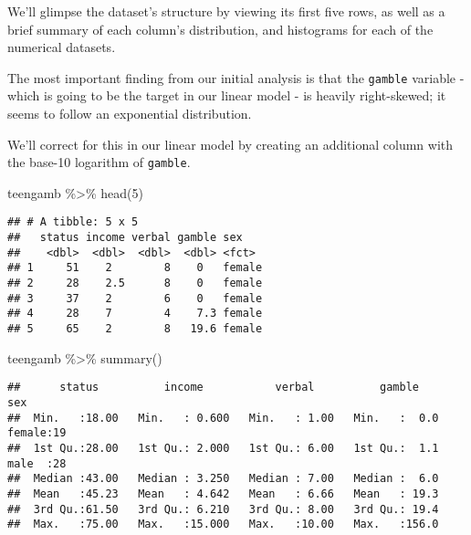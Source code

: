 \documentclass[
]{article}
\newenvironment{Shaded}{\begin{snugshade}}{\end{snugshade}}
\newcommand{\DecValTok}[1]{\textcolor[rgb]{0.00,0.00,0.81}{#1}}
\newcommand{\FunctionTok}[1]{\textcolor[rgb]{0.00,0.00,0.00}{#1}}
\newcommand{\NormalTok}[1]{#1}
\newcommand{\SpecialCharTok}[1]{\textcolor[rgb]{0.00,0.00,0.00}{#1}}
\begin{document}
We'll glimpse the dataset's structure by viewing its first five rows, as
well as a brief summary of each column's distribution, and histograms
for each of the numerical datasets.

The most important finding from our initial analysis is that the
\texttt{gamble} variable - which is going to be the target in our linear
model - is heavily right-skewed; it seems to follow an exponential
distribution.

We'll correct for this in our linear model by creating an additional
column with the base-10 logarithm of \texttt{gamble}.

\begin{Shaded}
\begin{Highlighting}[]
\NormalTok{teengamb }\SpecialCharTok{\%\textgreater{}\%} \FunctionTok{head}\NormalTok{(}\DecValTok{5}\NormalTok{)}
\end{Highlighting}
\end{Shaded}

\begin{verbatim}
## # A tibble: 5 x 5
##   status income verbal gamble sex   
##    <dbl>  <dbl>  <dbl>  <dbl> <fct> 
## 1     51    2        8    0   female
## 2     28    2.5      8    0   female
## 3     37    2        6    0   female
## 4     28    7        4    7.3 female
## 5     65    2        8   19.6 female
\end{verbatim}

\begin{Shaded}
\begin{Highlighting}[]
\NormalTok{teengamb }\SpecialCharTok{\%\textgreater{}\%} \FunctionTok{summary}\NormalTok{()}
\end{Highlighting}
\end{Shaded}

\begin{verbatim}
##      status          income           verbal          gamble          sex    
##  Min.   :18.00   Min.   : 0.600   Min.   : 1.00   Min.   :  0.0   female:19  
##  1st Qu.:28.00   1st Qu.: 2.000   1st Qu.: 6.00   1st Qu.:  1.1   male  :28  
##  Median :43.00   Median : 3.250   Median : 7.00   Median :  6.0              
##  Mean   :45.23   Mean   : 4.642   Mean   : 6.66   Mean   : 19.3              
##  3rd Qu.:61.50   3rd Qu.: 6.210   3rd Qu.: 8.00   3rd Qu.: 19.4              
##  Max.   :75.00   Max.   :15.000   Max.   :10.00   Max.   :156.0
\end{verbatim}
\end{document}
